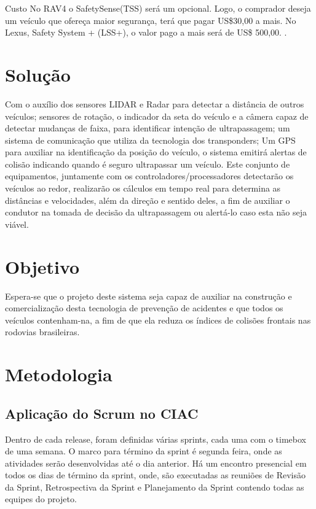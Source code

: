 Custo No RAV4 o SafetySense(TSS) será um opcional. Logo, o comprador deseja um
veículo que ofereça maior segurança, terá que pagar US\$30,00 a mais. No Lexus,
Safety System + (LSS+), o valor pago a mais será de US\$ 500,00. \cite{1comper}.

\section{Solução}

Com o auxílio dos sensores LIDAR e Radar para detectar a distância de outros
veículos; sensores de rotação, o indicador da seta do veículo e a câmera capaz
de detectar mudanças de faixa, para identificar intenção de ultrapassagem; um
sistema de comunicação que utiliza da tecnologia dos transponders; Um GPS para
auxiliar na identificação da posição do veículo, o sistema emitirá alertas de
colisão indicando quando é seguro ultrapassar um veículo. Este conjunto de
equipamentos, juntamente com os controladores/processadores detectarão os
veículos ao redor, realizarão os cálculos em tempo real para determina as
distâncias e velocidades, além da direção e sentido deles, a fim de auxiliar o
condutor na tomada de decisão da ultrapassagem ou alertá-lo caso esta não seja viável.

\section{Objetivo}
Espera-se que o projeto deste sistema seja capaz de auxiliar na construção e
comercialização desta tecnologia de prevenção de acidentes e que todos os veículos
contenham-na, a fim de que ela reduza os índices de colisões frontais nas rodovias
brasileiras.

\section{Metodologia}

\subsection{Aplicação do Scrum no CIAC}
Dentro de cada release, foram definidas várias sprints, cada uma com o timebox de
uma semana. O marco para término da sprint é segunda feira, onde as atividades
serão desenvolvidas até o dia anterior. Há um encontro presencial em todos os
dias de término da sprint, onde, são executadas as reuniões de Revisão da Sprint,
 Retrospectiva da Sprint e Planejamento da Sprint contendo todas as equipes do projeto.

